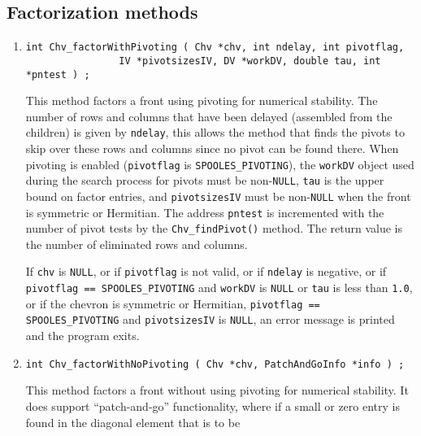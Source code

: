 \subsection{Factorization methods}
\label{subsection:Chv:proto:factor}
\par
\begin{enumerate}
\item
\begin{verbatim}
int Chv_factorWithPivoting ( Chv *chv, int ndelay, int pivotflag, 
                IV *pivotsizesIV, DV *workDV, double tau, int *pntest ) ;
\end{verbatim}
This method factors a front using pivoting for numerical stability.
The number of rows and columns that have been delayed (assembled
from the children) is given by {\tt ndelay}, this allows the method
that finds the pivots to skip over these rows and columns since no
pivot can be found there.
When pivoting is enabled ({\tt pivotflag} is {\tt SPOOLES\_PIVOTING}), 
the {\tt workDV}
object used during the search process for pivots
must be non-{\tt NULL}, 
{\tt tau} is the upper bound on factor entries, and {\tt pivotsizesIV}
must be non-{\tt NULL} when the front is symmetric or Hermitian.
The address {\tt pntest} is incremented with the number of pivot
tests by the {\tt Chv\_findPivot()} method.
The return value is the number of eliminated rows and columns.
\par {}
If {\tt chv} is {\tt NULL},
or if  {\tt pivotflag} is not valid,
or if {\tt ndelay} is negative,
or if {\tt pivotflag == SPOOLES\_PIVOTING} 
and {\tt workDV} is {\tt NULL} or {\tt tau} is less than {\tt 1.0},
or if the chevron is symmetric or Hermitian, 
{\tt pivotflag == SPOOLES\_PIVOTING} and
{\tt pivotsizesIV} is {\tt NULL},
an error message is printed and the program exits.
\item
\begin{verbatim}
int Chv_factorWithNoPivoting ( Chv *chv, PatchAndGoInfo *info ) ;
\end{verbatim}
This method factors a front without using pivoting 
for numerical stability.
It does support ``patch-and-go'' functionality, where if a small or
zero entry is found in the diagonal element that is to be

\end{enumerate}
